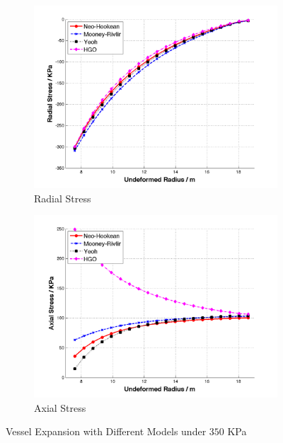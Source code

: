 \begin{figure}[t!p]
	\begin{subfigure}[b]{0.5\textwidth}
		\centering
		\includegraphics[width=\textwidth]{./figures/radial_models.png}
		\caption{Radial Stress}
		\label{radial_models}
	\end{subfigure}
	\begin{subfigure}[b]{0.5\textwidth}
		\centering
		\includegraphics[width=\textwidth]{./figures/axial_models.png}
		\caption{Axial Stress}
		\label{axial_models}
	\end{subfigure}
	\caption{Vessel Expansion with Different Models under $350$ KPa}
	\label{fig:models}
\end{figure}

